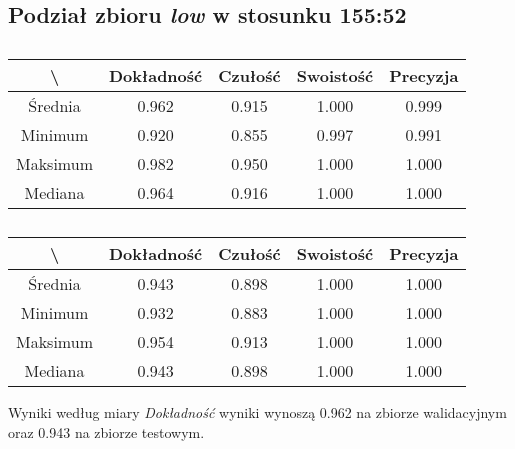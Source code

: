 \subsection{Podział zbioru \textit{low} w stosunku 155:52}


\begin{table}[H]
	\centering
	\caption{}
	\vspace{6pt}
	{\footnotesize
		\begin{tabular}{|c|c|c|c|c|}
      \hline \textbackslash & Dokładność & Czułość & Swoistość & Precyzja \\
      \hline Średnia & 0.962 & 0.915 & 1.000 & 0.999 \\
      \hline Minimum & 0.920 & 0.855 & 0.997 & 0.991 \\
      \hline Maksimum & 0.982 & 0.950 & 1.000 & 1.000 \\
      \hline Mediana & 0.964 & 0.916 & 1.000 & 1.000 \\
      \hline
    \end{tabular}
    \label{Tab:lowsplitc_val}
	}
	\vspace{0pt}
\end{table}

\begin{table}[H]
	\centering
	\caption{}
	\vspace{6pt}
	{\footnotesize
		\begin{tabular}{|c|c|c|c|c|}
      \hline \textbackslash & Dokładność & Czułość & Swoistość & Precyzja \\
      \hline Średnia & 0.943 & 0.898 & 1.000 & 1.000 \\
      \hline Minimum & 0.932 & 0.883 & 1.000 & 1.000 \\
      \hline Maksimum & 0.954 & 0.913 & 1.000 & 1.000 \\
      \hline Mediana & 0.943 & 0.898 & 1.000 & 1.000 \\
      \hline
    \end{tabular}
    \label{Tab:lowsplitc_test}
	}
	\vspace{0pt}
\end{table}

Wyniki według miary \textit{Dokładność} wyniki wynoszą 0.962 na zbiorze walidacyjnym oraz 0.943 na zbiorze testowym.
